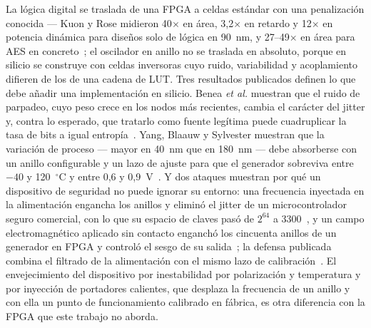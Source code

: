 La lógica digital se traslada de una FPGA a celdas estándar con una
penalización conocida --- Kuon y Rose midieron 40$\times$ en área,
3,2$\times$ en retardo y 12$\times$ en potencia dinámica para diseños solo
de lógica en 90~nm, y 27--49$\times$ en área para AES en
concreto~\cite{kuon2006}; el oscilador en anillo no se traslada en
absoluto, porque en silicio se construye con celdas
inversoras cuyo ruido, variabilidad y acoplamiento difieren de los de una
cadena de LUT. Tres resultados publicados definen lo que debe añadir una
implementación en silicio. Benea \emph{et al.} muestran que el ruido de
parpadeo, cuyo peso crece en los nodos más recientes, cambia el carácter
del jitter y, contra lo esperado, que tratarlo como fuente legítima puede
cuadruplicar la tasa de bits a igual entropía~\cite{benea_2024_flicker}.
Yang, Blaauw y Sylvester muestran que la variación de proceso --- mayor en
40~nm que en 180~nm --- debe absorberse con un anillo configurable y un
lazo de ajuste para que el generador sobreviva entre $-40$ y
120~$^\circ$C y entre 0,6 y 0,9~V~\cite{yang_2016_jssc}. Y dos ataques
muestran por qué un dispositivo de seguridad no puede ignorar su entorno:
una frecuencia inyectada en la alimentación engancha los anillos y
eliminó el jitter de un microcontrolador seguro comercial, con lo que su
espacio de claves pasó de $2^{64}$ a 3300~\cite{markettos_2009_frequency},
y un campo electromagnético aplicado sin contacto enganchó los cincuenta
anillos de un generador en FPGA y controló el sesgo de su
salida~\cite{bayon_2012_contactless}; la defensa publicada combina el
filtrado de la alimentación con el mismo lazo de
calibración~\cite{yang_2016_jssc}. El envejecimiento del dispositivo
por inestabilidad por polarización y temperatura y por inyección de
portadores calientes, que desplaza la frecuencia de un anillo y con ella
un punto de funcionamiento calibrado en fábrica, es otra diferencia con
la FPGA que este trabajo no aborda.

